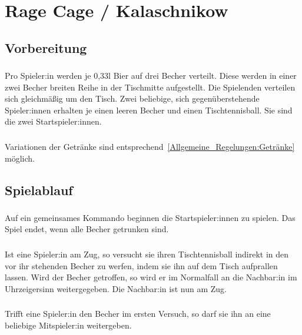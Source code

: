 \section{Rage Cage / Kalaschnikow}
\subsection{Vorbereitung}
\subsubsection{}
Pro Spieler:in werden je 0,33l Bier auf drei Becher verteilt.
Diese werden in einer zwei Becher breiten Reihe in der Tischmitte aufgestellt.
Die Spielenden verteilen sich gleichmäßig um den Tisch.
Zwei beliebige, sich gegenüberstehende Spieler:innen erhalten je einen leeren Becher und einen Tischtennisball.
Sie sind die zwei Startspieler:innen.

\subsubsection{}
Variationen der Getränke sind entsprechend~\ref{Allgemeine_Regelungen:Getränke} möglich.

\subsection{Spielablauf}
\subsubsection{}
Auf ein gemeinsames Kommando beginnen die Startspieler:innen zu spielen.
Das Spiel endet, wenn alle Becher getrunken sind.

\subsubsection{}
Ist eine Spieler:in am Zug, so versucht sie ihren Tischtennisball indirekt in den vor ihr stehenden Becher zu werfen, indem sie ihn auf dem Tisch aufprallen lassen.
Wird der Becher getroffen, so wird er im Normalfall an die Nachbar:in im Uhrzeigersinn weitergegeben.
Die Nachbar:in ist nun am Zug.

\subsubsection{}
Trifft eine Spieler:in den Becher im ersten Versuch, so darf sie ihn an eine beliebige Mitspieler:in weitergeben.

